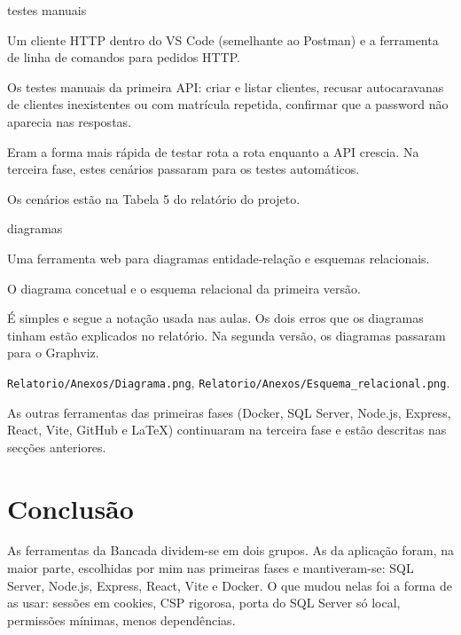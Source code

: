 \documentclass[a4paper,12pt]{article}
\newenvironment{ficha}[2]{%
  \par\needspace{7\baselineskip}\medskip\noindent{\large\bfseries #1}\hfill{\small\color{gray!70!black}#2}\par\nopagebreak\smallskip
  \begin{description}[leftmargin=3.1cm,labelwidth=2.8cm,labelsep=0.3cm,font=\normalfont\bfseries\small,itemsep=2pt,topsep=2pt,before=\raggedright]
}{\end{description}\medskip}
\begin{document}
\begin{ficha}{Thunder Client e curl}{testes manuais}
  \item[O que é] Um cliente HTTP dentro do VS Code (semelhante ao Postman) e a ferramenta de linha de comandos para pedidos HTTP.
  \item[Para que serviu] Os testes manuais da primeira API: criar e listar clientes, recusar autocaravanas de clientes inexistentes ou com matrícula repetida, confirmar que a password não aparecia nas respostas.
  \item[Porquê] Eram a forma mais rápida de testar rota a rota enquanto a API crescia. Na terceira fase, estes cenários passaram para os testes automáticos.
  \item[Onde está] Os cenários estão na Tabela 5 do relatório do projeto.
\end{ficha}

\begin{ficha}{ERDPlus}{diagramas}
  \item[O que é] Uma ferramenta web para diagramas entidade-relação e esquemas relacionais.
  \item[Para que serviu] O diagrama concetual e o esquema relacional da primeira versão.
  \item[Porquê] É simples e segue a notação usada nas aulas. Os dois erros que os diagramas tinham estão explicados no relatório. Na segunda versão, os diagramas passaram para o Graphviz.
  \item[Onde está] \texttt{Relatorio/Anexos/Diagrama.png}, \texttt{Relatorio/Anexos/Esquema\_relacional.png}.
\end{ficha}

As outras ferramentas das primeiras fases (Docker, SQL Server, Node.js, Express, React, Vite, GitHub e LaTeX) continuaram na terceira fase e estão descritas nas secções anteriores.

\section{Conclusão}

As ferramentas da Bancada dividem-se em dois grupos. As da aplicação foram, na maior parte, escolhidas por mim nas primeiras fases e mantiveram-se: SQL Server, Node.js, Express, React, Vite e Docker. O que mudou nelas foi a forma de as usar: sessões em cookies, CSP rigorosa, porta do SQL Server só local, permissões mínimas, menos dependências.
\end{document}
